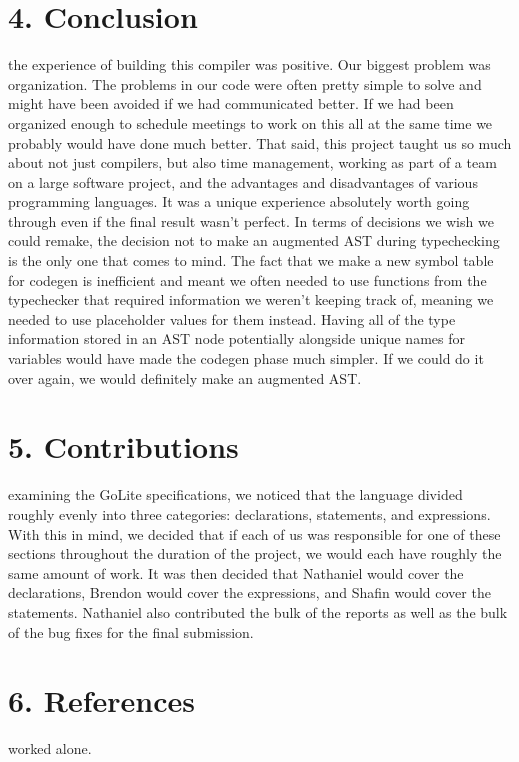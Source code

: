 \documentclass{article}
\begin{document}
\section*{4. Conclusion}\mbox{}
 the experience of building this compiler was positive.
Our biggest problem was organization.
The problems in our code were often pretty simple to solve and might have been avoided if we had communicated better.
If we had been organized enough to schedule meetings to work on this all at the same time we probably would have done much better.
That said, this project taught us so much about not just compilers, but also time management, working as part of a team on a large software project, and the advantages and disadvantages of various programming languages.
It was a unique experience absolutely worth going through even if the final result wasn't perfect.
In terms of decisions we wish we could remake, the decision not to make an augmented AST during typechecking is the only one that comes to mind.
The fact that we make a new symbol table for codegen is inefficient and meant we often needed to use functions from the typechecker that required information we weren't keeping track of, meaning we needed to use placeholder values for them instead.
Having all of the type information stored in an AST node potentially alongside unique names for variables would have made the codegen phase much simpler.
If we could do it over again, we would definitely make an augmented AST.

\section*{5. Contributions}\mbox{}
 examining the GoLite specifications, we noticed that the language divided roughly evenly into three categories: declarations, statements, and expressions.
With this in mind, we decided that if each of us was responsible for one of these sections throughout the duration of the project, we would each have roughly the same amount of work.
It was then decided that Nathaniel would cover the declarations, Brendon would cover the expressions, and Shafin would cover the statements.
Nathaniel also contributed the bulk of the reports as well as the bulk of the bug fixes for the final submission.
\section*{6. References}\mbox{}
 worked alone.
\end{document}

